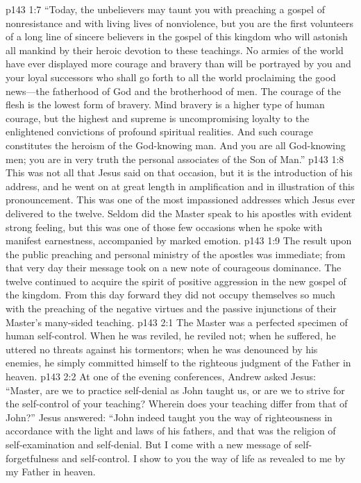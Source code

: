 \vs p143 1:7 \textcolor{ubdarkred}{“Today, the unbelievers may taunt you with preaching a gospel of nonresistance and with living lives of nonviolence, but you are the first volunteers of a long line of sincere believers in the gospel of this kingdom who will astonish all mankind by their heroic devotion to these teachings. No armies of the world have ever displayed more courage and bravery than will be portrayed by you and your loyal successors who shall go forth to all the world proclaiming the good news---the fatherhood of God and the brotherhood of men. The courage of the flesh is the lowest form of bravery. Mind bravery is a higher type of human courage, but the highest and supreme is uncompromising loyalty to the enlightened convictions of profound spiritual realities. And such courage constitutes the heroism of the God\hyp{}knowing man. And you are all God\hyp{}knowing men; you are in very truth the personal associates of the Son of Man.”}\minusone
\pc \vs p143 1:8 This was not all that Jesus said on that occasion, but it is the introduction of his address, and he went on at great length in amplification and in illustration of this pronouncement. This was one of the most impassioned addresses which Jesus ever delivered to the twelve. Seldom did the Master speak to his apostles with evident strong feeling, but this was one of those few occasions when he spoke with manifest earnestness, accompanied by marked emotion.
\pc \vs p143 1:9 The result upon the public preaching and personal ministry of the apostles was immediate; from that very day their message took on a new note of courageous dominance. The twelve continued to acquire the spirit of positive aggression in the new gospel of the kingdom. From this day forward they did not occupy themselves so much with the preaching of the negative virtues and the passive injunctions of their Master’s many\hyp{}sided teaching.
\vs p143 2:1 The Master was a perfected specimen of human self\hyp{}control. When he was reviled, he reviled not; when he suffered, he uttered no threats against his tormentors; when he was denounced by his enemies, he simply committed himself to the righteous judgment of the Father in heaven.
\pc \vs p143 2:2 At one of the evening conferences, Andrew asked Jesus: “Master, are we to practice self\hyp{}denial as John taught us, or are we to strive for the self\hyp{}control of your teaching? Wherein does your teaching differ from that of John?” Jesus answered: \textcolor{ubdarkred}{“John indeed taught you the way of righteousness in accordance with the light and laws of his fathers, and that was the religion of self\hyp{}examination and self\hyp{}denial. But I come with a new message of self\hyp{}forgetfulness and self\hyp{}control. I show to you the way of life as revealed to me by my Father in heaven.}
